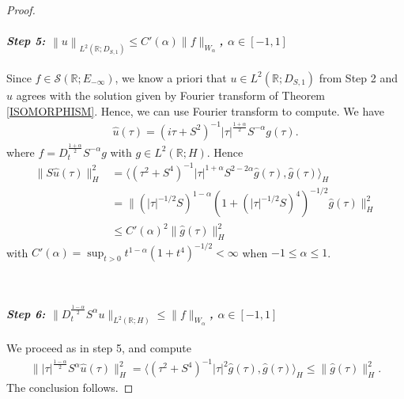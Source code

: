 \documentclass[10pt,a4paper]{amsart}
\begin{document}
\begin{proof}
\paragraph{\textit{Step 5:  $\left\|u \right\|_{L^2(\mathbb{R}; D_{S,1})}\le C'(\alpha) \|f\|_{W_{\alpha}}$, $ \alpha\in [-1,1]$}}
Since $f\in \mathcal{S}(\mathbb{R}; E_{-\infty})$, we know a priori that $u\in L^2(\mathbb{R}; D_{S,1})$ from Step 2 and $u$ agrees with the solution given by Fourier transform of Theorem \ref{ISOMORPHISM}. Hence, we can use Fourier transform to compute. We have 
\begin{align*}
    \hat{u}(\tau) = ({i}\tau +S^2)^{-1} \left | \tau  \right |^{\frac{1+\alpha}{2} }S^{-\alpha}g(\tau).
\end{align*}
where $f=D_t^{\frac{1+\alpha}{2}}S^{-\alpha}g$ with $g\in L^2(\mathbb{R}; H)$.
Hence
\begin{align*}
    \|S\hat u(\tau)\|^2_H
&= \langle (\tau^2+S^4)^{-1} |\tau|^{1+\alpha}S^{2-2\alpha} \hat g(\tau), \hat g(\tau)
\rangle_H \\
&= \|(|\tau|^{-1/2}S)^{1-\alpha}(1+(|\tau|^{-1/2}S)^4)^{-1/2}\hat g(\tau)\|_H^2 
\\
&
\le C'(\alpha)^2 \|\hat g(\tau)\|_H
^2
\end{align*}
with $C'(\alpha)= \sup_{t>0} t^{1-\alpha}(1+t^4)^{-1/2}<\infty$ when $-1\le \alpha \le 1$.

\

\paragraph{\textit{Step 6:  $\|D_t^{\frac{1-\alpha}{2}}S^\alpha u\|_{L^2(\mathbb{R};H)}  \le  \|f\|_{W_{\alpha}}$, $ \alpha\in [-1,1]$}}

We proceed as in step 5, and compute
\begin{align*}
    \||\tau|^{\frac{1-\alpha}{2}}S^\alpha \hat u(\tau)\|^2_H
= \langle (\tau^2+S^4)^{-1} |\tau|^{2} \hat g(\tau), \hat g(\tau)
\rangle_H 
\le  \|\hat g(\tau)\|_H
^2.
\end{align*}
 The conclusion follows. 
 \end{proof}
\end{document}
